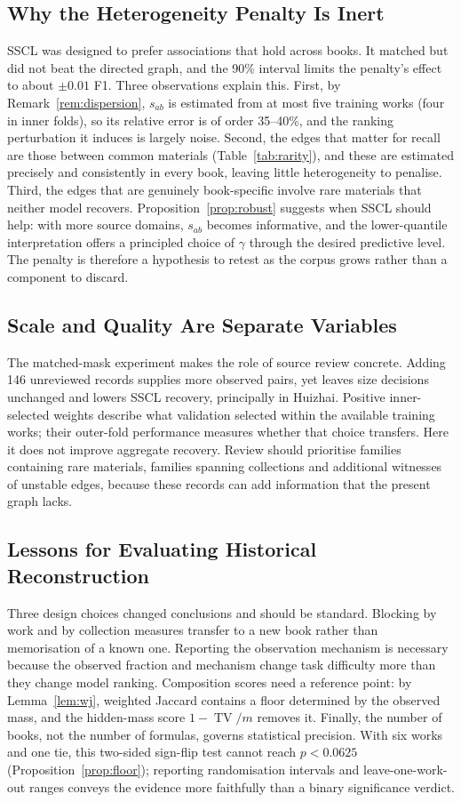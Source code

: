 \documentclass[applsci,article,submit,oneauthor]{Definitions/mdpi}
\newcommand{\TV}{\operatorname{TV}}
\begin{document}
\subsection{Why the Heterogeneity Penalty Is Inert}
\label{sec:disc-penalty}
SSCL was designed to prefer associations that hold across books. It matched but did not beat the directed graph, and the 90\% interval limits the penalty's effect to about $\pm0.01$ F1. Three observations explain this. First, by Remark~\ref{rem:dispersion}, $s_{ab}$ is estimated from at most five training works (four in inner folds), so its relative error is of order 35--40\%, and the ranking perturbation it induces is largely noise. Second, the edges that matter for recall are those between common materials (Table~\ref{tab:rarity}), and these are estimated precisely and consistently in every book, leaving little heterogeneity to penalise. Third, the edges that are genuinely book-specific involve rare materials that neither model recovers. Proposition~\ref{prop:robust} suggests when SSCL should help: with more source domains, $s_{ab}$ becomes informative, and the lower-quantile interpretation offers a principled choice of $\gamma$ through the desired predictive level. The penalty is therefore a hypothesis to retest as the corpus grows rather than a component to discard.

\subsection{Scale and Quality Are Separate Variables}
The matched-mask experiment makes the role of source review concrete. Adding 146 unreviewed records supplies more observed pairs, yet leaves size decisions unchanged and lowers SSCL recovery, principally in Huizhai. Positive inner-selected weights describe what validation selected within the available training works; their outer-fold performance measures whether that choice transfers. Here it does not improve aggregate recovery. Review should prioritise families containing rare materials, families spanning collections and additional witnesses of unstable edges, because these records can add information that the present graph lacks.

\subsection{Lessons for Evaluating Historical Reconstruction}
Three design choices changed conclusions and should be standard. Blocking by work and by collection measures transfer to a new book rather than memorisation of a known one. Reporting the observation mechanism is necessary because the observed fraction and mechanism change task difficulty more than they change model ranking. Composition scores need a reference point: by Lemma~\ref{lem:wj}, weighted Jaccard contains a floor determined by the observed mass, and the hidden-mass score $1-\TV/m$ removes it. Finally, the number of books, not the number of formulas, governs statistical precision. With six works and one tie, this two-sided sign-flip test cannot reach $p<0.0625$ (Proposition~\ref{prop:floor}); reporting randomisation intervals and leave-one-work-out ranges conveys the evidence more faithfully than a binary significance verdict.
\end{document}
